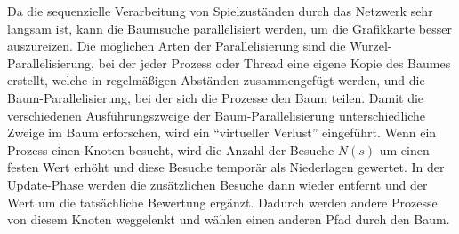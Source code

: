 Da die sequenzielle Verarbeitung von Spielzuständen durch das Netzwerk sehr langsam ist, kann die Baumsuche parallelisiert werden, um die Grafikkarte besser auszureizen.
Die möglichen Arten der Parallelisierung sind die Wurzel-Parallelisierung, bei der jeder Prozess oder Thread eine eigene Kopie des Baumes erstellt, welche in regelmäßigen Abständen zusammengefügt werden, und die Baum-Parallelisierung, bei der sich die Prozesse den Baum teilen.
Damit die verschiedenen Ausführungszweige der Baum-Parallelisierung unterschiedliche Zweige im Baum erforschen, wird ein ``virtueller Verlust'' eingeführt.
Wenn ein Prozess einen Knoten besucht, wird die Anzahl der Besuche $N(s)$ um einen festen Wert erhöht und diese Besuche temporär als Niederlagen gewertet.
In der Update-Phase werden die zusätzlichen Besuche dann wieder entfernt und der Wert um die tatsächliche Bewertung ergänzt.
Dadurch werden andere Prozesse von diesem Knoten weggelenkt und wählen einen anderen Pfad durch den Baum.
